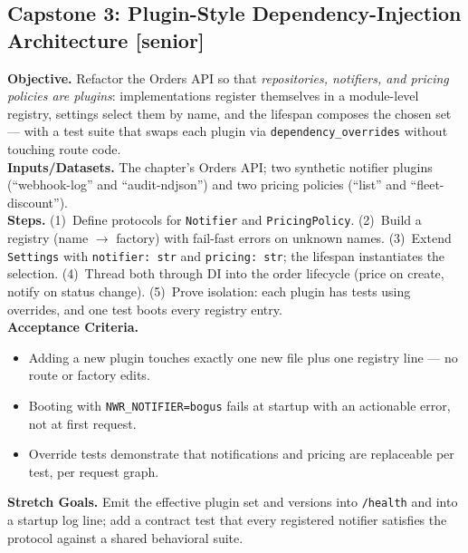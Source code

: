 \subsection{Capstone 3: Plugin-Style Dependency-Injection Architecture [senior]}
\textbf{Objective.} Refactor the Orders API so that \emph{repositories,
notifiers, and pricing policies are plugins}: implementations register
themselves in a module-level registry, settings select them by name, and the
lifespan composes the chosen set --- with a test suite that swaps each plugin
via \texttt{dependency\_overrides} without touching route code.\\
\textbf{Inputs/Datasets.} The chapter's Orders API; two synthetic notifier
plugins (``webhook-log'' and ``audit-ndjson'') and two pricing policies
(``list'' and ``fleet-discount'').\\
\textbf{Steps.} (1)~Define protocols for \texttt{Notifier} and
\texttt{PricingPolicy}. (2)~Build a registry (name $\to$ factory) with
fail-fast errors on unknown names. (3)~Extend \texttt{Settings} with
\texttt{notifier: str} and \texttt{pricing: str}; the lifespan instantiates
the selection. (4)~Thread both through DI into the order lifecycle (price on
create, notify on status change). (5)~Prove isolation: each plugin has tests
using overrides, and one test boots every registry entry.\\
\textbf{Acceptance Criteria.}
\begin{itemize}
  \item[$\square$] Adding a new plugin touches exactly one new file plus one
        registry line --- no route or factory edits.
  \item[$\square$] Booting with \texttt{NWR\_NOTIFIER=bogus} fails at startup
        with an actionable error, not at first request.
  \item[$\square$] Override tests demonstrate that notifications and pricing
        are replaceable per test, per request graph.
\end{itemize}
\textbf{Stretch Goals.} Emit the effective plugin set and versions into
\texttt{/health} and into a startup log line; add a contract test that every
registered notifier satisfies the protocol against a shared behavioral suite.

